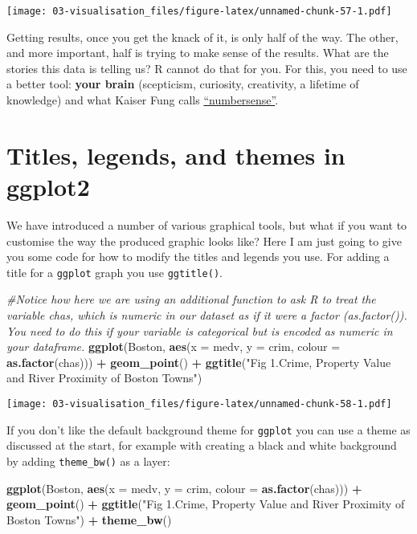 \documentclass[
]{book}
\newenvironment{Shaded}{\begin{snugshade}}{\end{snugshade}}
\newcommand{\AttributeTok}[1]{\textcolor[rgb]{0.13,0.29,0.53}{#1}}
\newcommand{\CommentTok}[1]{\textcolor[rgb]{0.56,0.35,0.01}{\textit{#1}}}
\newcommand{\FunctionTok}[1]{\textcolor[rgb]{0.13,0.29,0.53}{\textbf{#1}}}
\newcommand{\NormalTok}[1]{#1}
\newcommand{\SpecialCharTok}[1]{\textcolor[rgb]{0.81,0.36,0.00}{\textbf{#1}}}
\newcommand{\StringTok}[1]{\textcolor[rgb]{0.31,0.60,0.02}{#1}}
\begin{document}
\texttt{[image: 03-visualisation\_files/figure-latex/unnamed-chunk-57-1.pdf]}

Getting results, once you get the knack of it, is only half of the way. The other, and more important, half is trying to make sense of the results. What are the stories this data is telling us? R cannot do that for you. For this, you need to use a better tool: \textbf{your brain} (scepticism, curiosity, creativity, a lifetime of knowledge) and what Kaiser Fung calls \href{http://www.amazon.co.uk/Numbersense-How-Data-Your-Advantage/dp/0071799664}{``numbersense''}.

\section{Titles, legends, and themes in ggplot2}\label{titles-legends-and-themes-in-ggplot2}

We have introduced a number of various graphical tools, but what if you want to customise the way the produced graphic looks like? Here I am just going to give you some code for how to modify the titles and legends you use. For adding a title for a \texttt{ggplot} graph you use \texttt{ggtitle()}.

\begin{Shaded}
\begin{Highlighting}[]
\CommentTok{\#Notice how here we are using an additional function to ask R to treat the variable chas, which is numeric in our dataset as if it were a factor (as.factor()). You need to do this if your variable is categorical but is encoded as numeric in your dataframe.}
\FunctionTok{ggplot}\NormalTok{(Boston, }\FunctionTok{aes}\NormalTok{(}\AttributeTok{x =}\NormalTok{ medv, }\AttributeTok{y =}\NormalTok{ crim, }\AttributeTok{colour =} \FunctionTok{as.factor}\NormalTok{(chas))) }\SpecialCharTok{+}
  \FunctionTok{geom\_point}\NormalTok{() }\SpecialCharTok{+}
  \FunctionTok{ggtitle}\NormalTok{(}\StringTok{"Fig 1.Crime, Property Value and River Proximity of Boston Towns"}\NormalTok{)}
\end{Highlighting}
\end{Shaded}

\texttt{[image: 03-visualisation\_files/figure-latex/unnamed-chunk-58-1.pdf]}

If you don't like the default background theme for \texttt{ggplot} you can use a theme as discussed at the start, for example with creating a black and white background by adding \texttt{theme\_bw()} as a layer:

\begin{Shaded}
\begin{Highlighting}[]
\FunctionTok{ggplot}\NormalTok{(Boston, }\FunctionTok{aes}\NormalTok{(}\AttributeTok{x =}\NormalTok{ medv, }\AttributeTok{y =}\NormalTok{ crim, }\AttributeTok{colour =} \FunctionTok{as.factor}\NormalTok{(chas))) }\SpecialCharTok{+}
  \FunctionTok{geom\_point}\NormalTok{() }\SpecialCharTok{+}
  \FunctionTok{ggtitle}\NormalTok{(}\StringTok{"Fig 1.Crime, Property Value and River Proximity of Boston Towns"}\NormalTok{) }\SpecialCharTok{+}
  \FunctionTok{theme\_bw}\NormalTok{()}
\end{Highlighting}
\end{Shaded}
\end{document}
